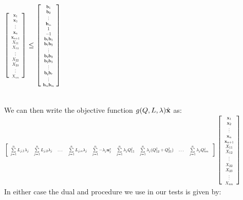$\large{\left[
	\scalebox{0.5}{%
		\begin{tabular}{ c }
		$\vx_1$ \\ 
		$\vx_2$ \\  
		$\vdots$ \\
		$\vx_n$ \\
		$\vx_{n+1} $\\
		$X_{11}$ \\ 
		$X_{12}$  \\
		$\vdots$ \\
		$X_{22}$\\
		$X_{23}$\\
		$\vdots$ \\
		$X_{nn}$ 
		\end{tabular}%
	} 
	\right]\leq \left[
	\scalebox{0.5}{%
		\begin{tabular}{ c }
		$\vb_1$ \\ 
		$\vb_2$ \\  
		$\vdots$ \\
		$\vb_m$ \\
		$1$ \\
		$-1$ \\
		$\vb_1\vb_1$ \\ 
		$\vb_1\vb_2$  \\
		$\vdots$ \\
		$\vb_2\vb_2$\\
		$\vb_2\vb_3$\\
		$\vdots$ \\
		$\vb_q\vb_r$\\
		$\vdots$ \\
		$\vb_m\vb_m$ 
		\end{tabular}%
	} 
	\right]}$

\ \\
We can then write the objective function $g(Q,L,\lambda)\hat{\mathbf{x}}$ as:\\

$\left[
\scalebox{0.6}{%
	\begin{tabular}{ c c c c c c c c c}
	$\sum\limits_{j=1}^nL_{j,1}\lambda_j$ & $\sum\limits_{j=1}^nL_{j,2}\lambda_j$ & $\dots$ & $\sum\limits_{j=1}^nL_{j,n}\lambda_j$ & $\sum\limits_{j=1}^n-\lambda_j\vu^*_j$ & $\sum\limits_{j=1}^n\lambda_jQ_{11}^j$ & $\sum\limits_{j=1}^n\lambda_j(Q_{12}^j+Q_{21}^j)$ & $\dots$ & $\sum\limits_{j=1}^n\lambda_jQ_{nn}^j$ \\ 
	\end{tabular}
}
\right] \left[
\scalebox{0.6}{%
	\begin{tabular}{ c }
	$\vx_1$ \\ 
	$\vx_2$ \\  
	$\vdots$ \\
	$\vx_n$ \\
	$\vx_{n+1}$ \\
	$X_{11}$ \\ 
	$X_{12}$  \\
	$\vdots$ \\
	$X_{22}$\\
	$X_{23}$\\
	$\vdots$ \\
	$X_{nn}$ 
	\end{tabular}%
}
\right] 
$
\ \\
In either case the dual and procedure we use in our tests is given by:


